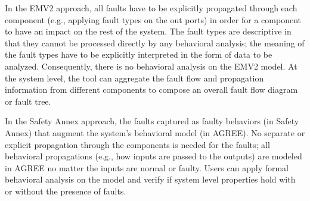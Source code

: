 In the EMV2 approach, all faults have to be explicitly propagated through each component (e.g., applying fault types on the out ports) in order for a component to have an impact on the rest of the system. The fault types are descriptive in that they cannot be processed directly by any behavioral analysis; the meaning of the fault types have to be explicitly interpreted in the form of data to be analyzed. Consequently, there is no behavioral analysis on the EMV2 model. At the system level, the tool can aggregate the fault flow and propagation information from different components to compose an overall fault flow diagram or fault tree.

In the Safety Annex approach, the faults captured as faulty behaviors (in Safety Annex) that augment the system's behavioral model (in AGREE). No separate or explicit propagation through the components is needed for the faults; all behavioral propagations (e.g., how inputs are passed to the outputs) are modeled in AGREE no matter the inputs are normal or faulty. Users can apply formal behavioral analysis on the model and verify if system level properties hold with or without the presence of faults. 


